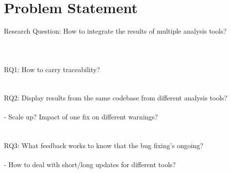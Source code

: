 \chapter{Problem Statement}
\label{ch:problemstatement}

Research Question: How to integrate the results of multiple analysis tools? \\ \\ \\ \\
 
RQ1: How to carry traceability? \\ \\ \\

RQ2: Display results from the same codebase from different analysis tools? \\ \\

- Scale up? Impact of one fix on different warnings? \\ \\ \\

RQ3: What feedback works to know that the bug fixing's ongoing? \\ \\

- How to deal with short/long updates for different tools? \\